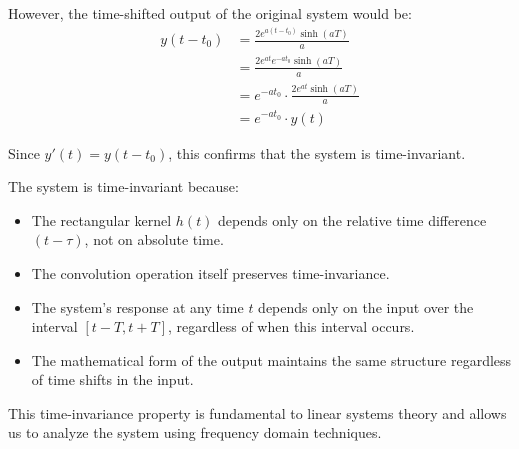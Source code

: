 \documentclass[12pt,a4paper,titlepage]{article}
\begin{document}
However, the time-shifted output of the original system would be:
\begin{align}
y(t-t_0) &= \frac{2e^{a(t-t_0)}\sinh(aT)}{a} \\
&= \frac{2e^{at}e^{-at_0}\sinh(aT)}{a} \\
&= e^{-at_0} \cdot \frac{2e^{at}\sinh(aT)}{a} \\
&= e^{-at_0} \cdot y(t)
\end{align}

Since $y'(t) = y(t-t_0)$, this confirms that the system is time-invariant.

The system is time-invariant because:
\begin{itemize}
    \item The rectangular kernel $h(t)$ depends only on the relative time difference $(t-\tau)$, not on absolute time.
    \item The convolution operation itself preserves time-invariance.
    \item The system's response at any time $t$ depends only on the input over the interval $[t-T, t+T]$, regardless of when this interval occurs.
    \item The mathematical form of the output maintains the same structure regardless of time shifts in the input.
\end{itemize}

This time-invariance property is fundamental to linear systems theory and allows us to analyze the system using frequency domain techniques.
\end{document}

